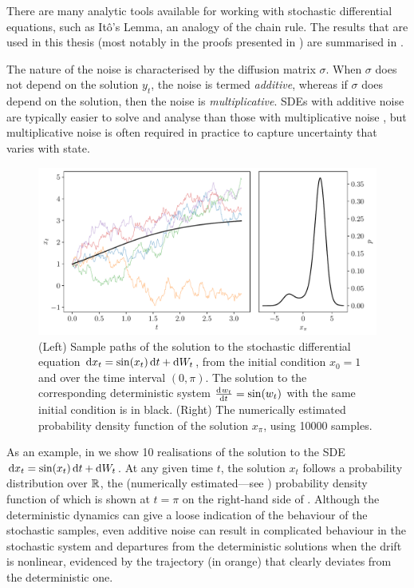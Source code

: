 There are many analytic tools available for working with stochastic differential equations, such as It\^o's Lemma, an analogy of the chain rule.
The results that are used in this thesis (most notably in the proofs presented in ) are summarised in .

The nature of the noise is characterised by the diffusion matrix \(\sigma\).
When \(\sigma\) does not depend on the solution \(y_t\), the noise is termed \emph{additive}, whereas if \(\sigma\) does depend on the solution, then the noise is \emph{multiplicative}.
SDEs with additive noise are typically easier to solve and analyse than those with multiplicative noise \citep{SanchoEtAl_1982_AnalyticalNumericalStudies}, but multiplicative noise is often required in practice to capture uncertainty that varies with state.

\begin{figure}
	\begin{center}
		\includegraphics[width=\textwidth]{chp02_background/figures/ou_solution.pdf}
		\caption{(Left) Sample paths of the solution to the stochastic differential equation \(\dif x_t = \sin\!\left(x_t\right)\dif t + \dif W_t\), from the initial condition \(x_0 = 1\) and over the time interval \((0,\pi)\).
			The solution to the corresponding deterministic system \(\od{w_t}{t} = \sin\!\left(w_t\right)\) with the same initial condition is in black.
			(Right) The numerically estimated probability density function of the solution \(x_\pi\), using 10000 samples.}
		\label{fig:sde_sol_sample}
	\end{center}
\end{figure}

As an example, in  we show 10 realisations of the solution to the SDE \(\dif x_t = \sin\!\left(x_t\right)\dif t + \dif W_t\).
At any given time \(t\), the solution \(x_t\) follows a probability distribution over \(\mathbb{R}\), the (numerically estimated---see ) probability density function of which is shown at \(t = \pi\) on the right-hand side of .
Although the deterministic dynamics can give a loose indication of the behaviour of the stochastic samples, even additive noise can result in complicated behaviour in the stochastic system and departures from the deterministic solutions when the drift is nonlinear, evidenced by the trajectory (in orange) that clearly deviates from the deterministic one.



